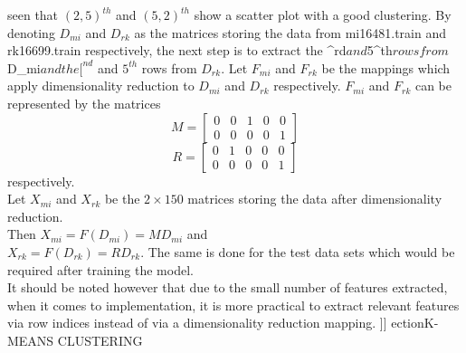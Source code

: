                        seen that $(2,5)^{th}$ and $(5,2)^{th}$ show a scatter plot with a good clustering. By denoting $D_{mi}$ and $D_{rk}$ as the matrices storing the data from mi16481.train and rk16699.train respectively, the next step is to extract the {^{rd}$ and $5^{th}$ rows from $D_{mi}$ and the [^{nd}$ and $5^{th}$ rows from $D_{rk}$. Let $F_{mi}$ and $F_{rk}$ be the mappings which apply dimensionality reduction to $D_{mi}$ and $D_{rk}$ respectively. $F_{mi}$ and $F_{rk}$ can be
                       represented by the matrices
                       \[
                       M=
                         \begin{bmatrix}
                             0 & 0 & 1 & 0 & 0 \\
                                 0 & 0 & 0 & 0 & 1
                                   \end{bmatrix}
                                   \]
                                   \[
                                   R=
                                     \begin{bmatrix}
                                         0 & 1 & 0 & 0 & 0 \\
                                             0 & 0 & 0 & 0 & 1
                                               \end{bmatrix}
                                               \]
                                               respectively.
                                               \\
                                               Let $X_{mi}$ and $X_{rk}$ be the $2 \times 150$ matrices storing the data after dimensionality reduction.
                                               \\
                                               Then $X_{mi} = F(D_{mi}) = MD_{mi}$ and
                                               \\ $X_{rk} = F(D_{rk}) = R D_{rk}$.
                                               The same is done for the test data sets which would be required after training the model.
                                               \\It should be noted however that due to the small number of features extracted, when it comes to implementation, it is more practical to extract relevant features via row indices instead of via a dimensionality reduction mapping.
                                               ]]}
ection{\label{sec:level3}K-MEANS CLUSTERING}
